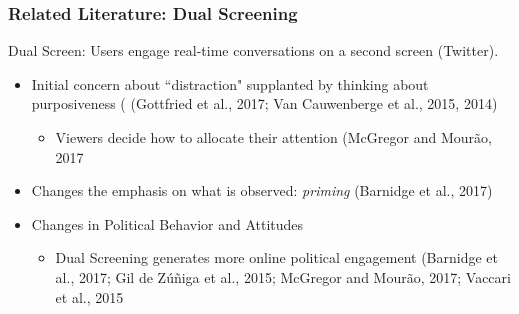 \documentclass{beamer}
\begin{document}
\begin{frame}
\frametitle{Related Literature: Dual Screening}


Dual Screen: Users engage real-time conversations on a second screen (Twitter). 

\pause

\vspace{3mm}
\begin{itemize}
    \item Initial concern about ``distraction" supplanted by thinking about purposiveness ( (Gottfried et al., 2017; Van Cauwenberge et al.,
2015, 2014)
      \begin{itemize}
        \item Viewers decide how to allocate their attention  (McGregor
and Mourão, 2017
    \end{itemize}
\end{itemize}

\begin{itemize}
    \item Changes the emphasis on what is observed: \textit{priming}  (Barnidge et al., 2017)
\end{itemize}  
\begin{itemize}
    \item Changes in Political Behavior and Attitudes
    \begin{itemize}
        \item Dual Screening generates more online political engagement (Barnidge et al., 2017; Gil de
Zúñiga et al., 2015; McGregor and Mourão, 2017; Vaccari et al., 2015
    \end{itemize}
\end{itemize}
\end{frame}
\end{document}
